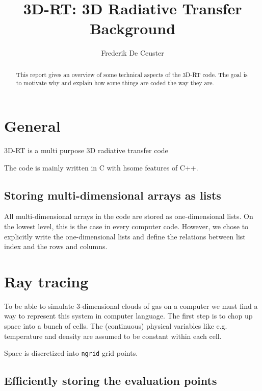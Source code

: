\documentclass[]{article}
\title{\vspace{0cm} \huge 3D-RT: 3D Radiative Transfer \\
                          { \Large \vskip3mm Background}}
\author{\large Frederik De Ceuster}
\date{}
\begin{document}
\maketitle

\vskip6cm

\begin{abstract}
This report gives an overview of some technical aspects of the 3D-RT code. The goal is to motivate why and explain how some things are coded the way they are.
\end{abstract}

\vskip6cm

\tableofcontents

\newpage


\section{General}

3D-RT is a multi purpose 3D radiative transfer code

The code is mainly written in C with hsome features of C++.

\subsection{Storing multi-dimensional arrays as lists}

All multi-dimensional arrays in the code are stored as one-dimensional lists. On the lowest level, this is the case in every computer code. However, we chose to explicitly write the one-dimensional lists and define the relations between list index and the rows and columns.

\section{Ray tracing}

To be able to simulate 3-dimensional clouds of gas on a computer we must find a way to represent this system in computer language. The first step is to chop up space into a bunch of cells. The (continuous) physical variables like e.g. temperature and density are assumed to be constant within each cell.

\bigskip

Space is discretized into \texttt{ngrid} grid points.

\subsection{Efficiently storing the evaluation points}
\end{document}

